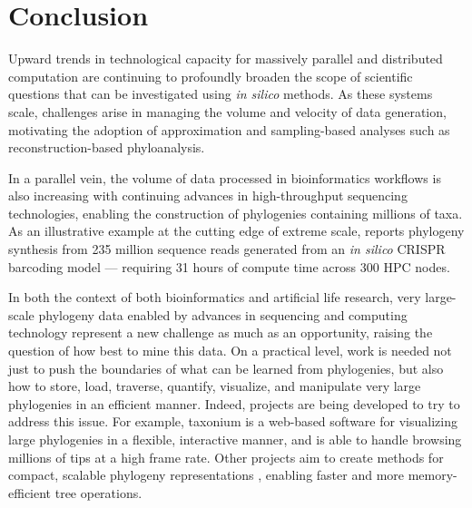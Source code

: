 \section{Conclusion} \label{sec:conclusion}

Upward trends in technological capacity for massively parallel and distributed computation are continuing to profoundly broaden the scope of scientific questions that can be investigated using \textit{in silico} methods.
As these systems scale, challenges arise in managing the volume and velocity of data generation, motivating the adoption of approximation and sampling-based analyses such as reconstruction-based phyloanalysis.

In a parallel vein, the volume of data processed in bioinformatics workflows is also increasing with continuing advances in high-throughput sequencing technologies, enabling the construction of phylogenies containing millions of taxa.
As an illustrative example at the cutting edge of extreme scale, \citet{konno2022deep} reports phylogeny synthesis from 235 million sequence reads generated from an \textit{in silico} CRISPR barcoding model --- requiring 31 hours of compute time across 300 HPC nodes.

In both the context of both bioinformatics and artificial life research, very large-scale phylogeny data enabled by advances in sequencing and computing technology represent a new challenge as much as an opportunity, raising the question of how best to mine this data.
On a practical level, work is needed not just to push the boundaries of what can be learned from phylogenies, but also how to store, load, traverse, quantify, visualize, and manipulate very large phylogenies in an efficient manner.
Indeed,  projects are being developed to try to address this issue.
For example, taxonium \citep{sanderson2022taxonium} is a web-based software for visualizing large phylogenies in a flexible, interactive manner, and is able to handle browsing millions of tips at a high frame rate.
Other projects aim to create methods for compact, scalable phylogeny representations \citep{moshiri2025compacttree, moshiri2020treeswift}, enabling faster and more memory-efficient tree operations.

